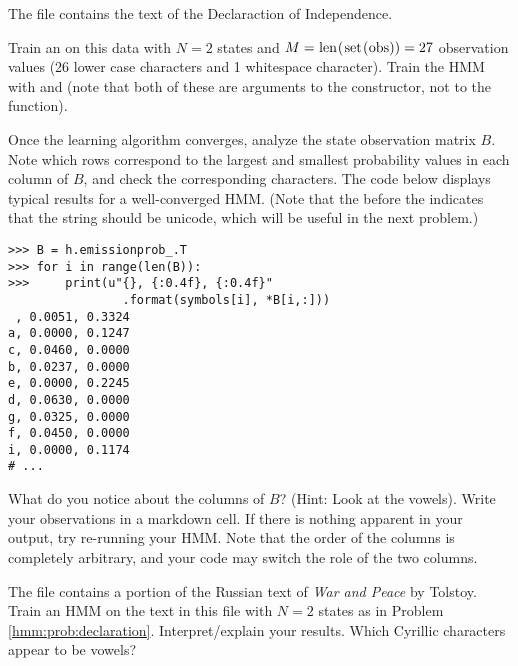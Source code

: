 \begin{problem}\label{hmm:prob:declaration}
The file  contains the text of the Declaraction of Independence.

Train an  on this data with $N=2$ states and $M=\text{\li{len(set(obs))}}=27$ observation values (26 lower case characters and 1 whitespace character).
Train the HMM with  and  (note that both of these are arguments to the constructor, not to the  function).

Once the learning algorithm converges, analyze the state observation matrix $B$.
Note which rows correspond to the largest and smallest probability values in each column of $B$,
and check the corresponding characters.
The code below displays typical results for a well-converged HMM. 
(Note that the  before the  indicates that the string should be unicode, which will be useful in the next problem.)
\begin{lstlisting}
>>> B = h.emissionprob_.T
>>> for i in range(len(B)):
>>>     print(u"{}, {:0.4f}, {:0.4f}"
                .format(symbols[i], *B[i,:]))
 , 0.0051, 0.3324
a, 0.0000, 0.1247
c, 0.0460, 0.0000
b, 0.0237, 0.0000
e, 0.0000, 0.2245
d, 0.0630, 0.0000
g, 0.0325, 0.0000
f, 0.0450, 0.0000
i, 0.0000, 0.1174
# ...
\end{lstlisting}
What do you notice about the columns of $B$?
(Hint: Look at the vowels).
Write your observations in a markdown cell.
If there is nothing apparent in your output, try re-running your HMM.
Note that the order of the columns is completely arbitrary, and your code may switch the role of the two columns.
\end{problem}

\begin{comment}
\begin{problem}
Repeat the previous calculation with 3 hidden states.
Interpret/explain your results.
Note that as the number of hidden states increases, the divisions of the characters will become more abstract and less interpretable.

With 3 hidden states, you can use the following to display the matrix $B$:
\begin{lstlisting}
print(u"{}, {:0.4f}, {:0.4f}, {:0.4f}"
        .format(symbols[i], *hmm_example.B[i,:]))
\end{lstlisting}
\end{problem}
\end{comment}

\begin{problem}
The file  contains a portion of the Russian text of \textit{War and Peace} by Tolstoy.
Train an HMM on the text in this file with $N=2$ states as in Problem \ref{hmm:prob:declaration}.
Interpret/explain your results.
Which Cyrillic characters appear to be vowels?
\end{problem}
